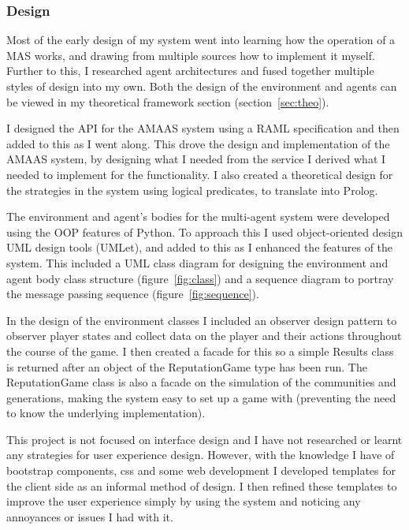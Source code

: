 \documentclass[]{final_report}
\begin{document}
\subsubsection{Design}
Most of the early design of my system went into learning how the operation of a MAS works, and drawing from multiple sources how to implement it myself. Further to this, I researched agent architectures and fused together multiple styles of design into my own. Both the design of the environment and agents can be viewed in my theoretical framework section (section~\ref{sec:theo}).\par 
I designed the API for the AMAAS system using a RAML specification and then added to this as I went along. This drove the design and implementation of the AMAAS system, by designing what I needed from the service I derived what I needed to implement for the functionality. I also created a theoretical design for the strategies in the system using logical predicates, to translate into Prolog.\par 
The environment and agent's bodies for the multi-agent system were developed using the OOP features of Python. To approach this I used object-oriented design UML design tools (UMLet), and added to this as I enhanced the features of the system. This included a UML class diagram for designing the environment and agent body class structure (figure~\ref{fig:class}) and a sequence diagram to portray the message passing sequence (figure~\ref{fig:sequence}).\par 
In the design of the environment classes I included an observer design pattern to observer player states and collect data on the player and their actions throughout the course of the game. I then created a facade for this so a simple Results class is returned after an object of the ReputationGame type has been run. The ReputationGame class is also a facade on the simulation of the communities and generations, making the system easy to set up a game with (preventing the need to know the underlying implementation).\par 
This project is not focused on interface design and I have not researched or learnt any strategies for user experience design. However, with the knowledge I have of bootstrap components, css and some web development I developed templates for the client side as an informal method of design. I then refined these templates to improve the user experience simply by using the system and noticing any annoyances or issues I had with it.
\end{document}
